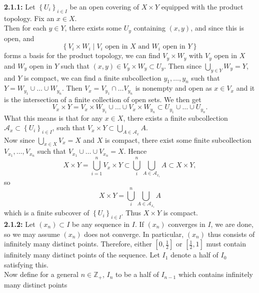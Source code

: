 \documentclass[a4paper]{article}
\begin{document}
   \textbf{2.1.1:} Let $\left\{ U_i \right\}_{i \in I}$ be an open covering of $X \times Y$ equipped
   with the product topology. Fix an $x \in X$.\\
   Then for each $y \in Y$, there exists some $U_{y}$ containing
    $(x,y)$, and since this is open, and 
    $$\left\{ V_i \times W_i  \mid V_i \text{ open in } X \text{ and }
    W_i \text{ open in } Y \right\} $$
    forms a basis for the product topology,
    we can find $V_{y} \times W_y$ with $V_y$ open in $X$ and $W_y$ open in
    $Y$ such that $(x,y) \in V_y \times W_y \subset U_y$. Then
    since $\bigcup_{y \in Y} W_y = Y$, and $Y$ is compact, we can find a finite
    subcollection $y_1, \ldots, y_n$ such that
    $Y = W_{y_1} \cup \ldots \cup W_{y_n}$. Then
    $V_x = V_{y_1} \cap \ldots V_{y_n}$ is nonempty and open as $x \in  V_x$ 
    and
    it is the intersection of a finite collection of open sets. 
    We then get
    \[
    V_x \times Y = V_x \times W_{y_1} \cup \ldots \cup V_x \times W_{y_n}
    \subset U_{y_1} \cup \ldots \cup U_{y_n}.
    \] 
    What this means is that for any $x \in X$, there exists
    a finite subcollection $\mathcal{A}_x \subset 
    \left\{ U_i \right\}_{i \in I}$, such that
    $V_x \times Y \subset \bigcup_{A \in \mathcal{A}_x} A$.\\
    Now since $\bigcup_{x \in X} V_x = X$ and $X$ is compact, there exist some 
    finite subcollection $V_{x_1}, \ldots, V_{x_n}$ such that
    $V_{x_1} \cup \ldots \cup V_{x_n} = X$.
    Hence
    \[
    X \times Y = \bigcup_{i=1}^{n} V_x \times Y
    \subset \bigcup_{i}^{n} \bigcup_{A \in \mathcal{A}_{x_i}} A \subset
    X \times Y,
    \] 
    so
    \[
    X \times Y = \bigcup_{i}^{n} \bigcup_{A \in \mathcal{A}_{x_i}} A
    \] 
    which is a finite subcover of $\left\{ U_i \right\}_{i \in I}$.
    Thus $X \times Y$ is compact.\\
    \linebreak
    \textbf{2.1.2:} Let
    $\left( x_n \right) \subset I$ be any sequence in $I$.
    If $(x_n)$ converges in $I$, we are done, so we may assume $(x_n)$ does not
    converge. In particular, $(x_n)$ thus consists of infinitely many distinct
    points. Therefore, either $\left[ 0, \frac{1}{2} \right] $ or
    $\left[ \frac{1}{2},1 \right] $ must contain infinitely many distinct
    points
    of the sequence. Let $I_1$ denote a half of $I_0$ satisfying this.\\
    Now define for a general  $n \in \mathbb{Z}_+$, $I_n$ to be
    a half of $I_{n-1}$ which contains infinitely many distinct points
\end{document}
